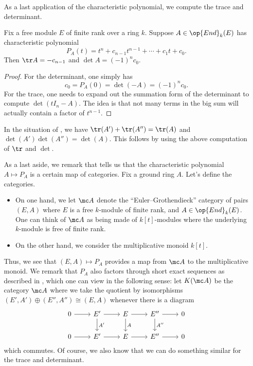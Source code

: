 \documentclass[../notes.tex]{subfiles}
\begin{document}
As a last application of the characteristic polynomial, we compute the trace and determinant.
\begin{proposition}
	Fix a free module $E$ of finite rank over a ring $k$. Suppose $A\in\op{End}_k(E)$ has characteristic polynomial
	\[P_A(t)=t^n+c_{n-1}t^{n-1}+\cdots+c_1t+c_0.\]
	Then $\tr A=-c_{n-1}$ and $\det A=(-1)^nc_0$.
\end{proposition}
\begin{proof}
	For the determinant, one simply has
	\[c_0=P_A(0)=\det(-A)=(-1)^nc_0.\]
	For the trace, one needs to expand out the summation form of the determinant to compute $\det(tI_n-A)$. The idea is that not many terms in the big sum will actually contain a factor of $t^{n-1}$.
\end{proof}
\begin{remark}
	In the situation of , we have $\tr(A')+\tr(A'')=\tr (A)$ and $\det(A')\det(A'')=\det (A)$. This follows by using the above computation of $\tr$ and $\det$.
\end{remark}
As a last aside, we remark that  tells us that the characteristic polynomial $A\mapsto P_A$ is a certain map of categories. Fix a ground ring $A$. Let's define the categories.
\begin{itemize}
	\item On one hand, we let $\mc A$ denote the ``Euler--Grothendieck'' category of pairs $(E,A)$ where $E$ is a free $k$-module of finite rank, and $A\in\op{End}_k(E)$. One can think of $\mc A$ as being made of $k[t]$-modules where the underlying $k$-module is free of finite rank.
	\item On the other hand, we consider the multiplicative monoid $k[t]$.
\end{itemize}
Thus, we see that $(E,A)\mapsto P_A$ provides a map from $\mc A$ to the multiplicative monoid. We remark that $P_A$ also factors through short exact sequences as described in , which one can view in the following sense: let $K(\mc A)$ be the category $\mc A$ where we take the quotient by isomorphisms $(E',A')\oplus(E'',A'')\cong(E,A)$ whenever there is a diagram
\[\begin{tikzcd}
	0 & {E'} & E & {E''} & 0 \\
	0 & {E'} & E & {E''} & 0
	\arrow[from=1-1, to=1-2]
	\arrow[from=1-2, to=1-3]
	\arrow["{A'}", from=1-2, to=2-2]
	\arrow[from=1-3, to=1-4]
	\arrow["A", from=1-3, to=2-3]
	\arrow[from=1-4, to=1-5]
	\arrow["{A''}", from=1-4, to=2-4]
	\arrow[from=2-1, to=2-2]
	\arrow[from=2-2, to=2-3]
	\arrow[from=2-3, to=2-4]
	\arrow[from=2-4, to=2-5]
\end{tikzcd}\]
which commutes. Of course, we also know that we can do something similar for the trace and determinant.
\end{document}
